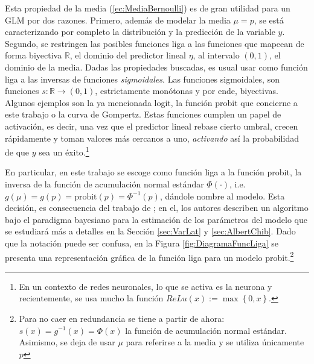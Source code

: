 \documentclass[../Main/Main.tex]{subfiles}
\begin{document}
Esta propiedad de la media (\ref{ec:MediaBernoulli}) es de gran utilidad para un GLM por dos razones. Primero, además de modelar la media $\mu = p$, se está caracterizando por completo la distribución y la predicción de la variable $y$. Segundo, se restringen las posibles funciones liga a las funciones que mapeean de forma biyectiva $\mathbb{R}$, el dominio del predictor lineal $\eta$, al intervalo $(0,1)$, el dominio de la media. Dadas las propiedades buscadas, es usual usar como función liga a las inversas de funciones \textit{sigmoidales}. Las funciones sigmoidales, son funciones $s:\mathbb{R}\rightarrow (0,1)$, estrictamente monótonas y por ende, biyectivas. Algunos ejemplos son la ya mencionada logit, la función probit que concierne a este trabajo o la curva de Gompertz. Estas funciones cumplen un papel de activación, es decir, una vez que el predictor lineal rebase cierto umbral, crecen rápidamente y toman valores más cercanos a uno, \textit{activando} así la probabilidad de que $y$ sea un éxito.\footnote{En un contexto de redes neuronales, lo que se activa es la neurona y recientemente, se usa mucho la función $\textit{ReLu}(x):= \max\left\{0,x\right\}$.}

En particular, en este trabajo se escoge como función liga a la función probit, la inversa de la función de acumulación normal estándar $\Phi(\cdot)$, i.e. $g(\mu) = g(p) = \text{probit}(p) = \Phi^{-1}(p)$, dándole nombre al modelo. Esta decisión, es consecuencia del trabajo de \citet{albert1993bayesian}; en el, los autores describen un algoritmo bajo el paradigma bayesiano para la estimación de los parámetros del modelo que se estudiará más a detalles en la Sección \ref{sec:VarLat} y \ref{sec:AlbertChib}. Dado que la notación puede ser confusa, en la Figura \ref{fig:DiagramaFuncLiga} se presenta una representación gráfica de la función liga para un modelo probit.\footnote{Para no caer en redundancia se tiene a partir de ahora: $s(x) = g^{-1}(x) = \Phi(x)$ la función de acumulación normal estándar. Asimismo, se deja de usar $\mu$ para referirse a la media y se utiliza únicamente $p$}
\end{document}
